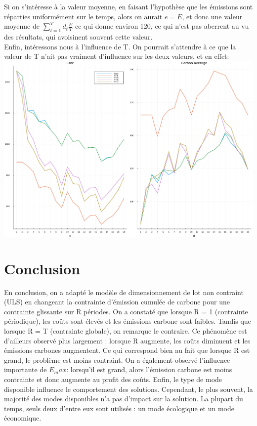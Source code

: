 \documentclass{article}
\begin{document}
	Si on s'intéresse à la valeur moyenne, en faisant l'hypothèse que les émissions sont réparties uniformément sur le temps, alors on aurait $e=E$, et donc une valeur moyenne de $\displaystyle{\sum_{t=1}^T d_t \frac{E}{T}}$ ce qui donne environ 120, ce qui n'est pas aberrent au vu des résultats, qui avoisinent souvent cette valeur.\\
	\newpage
	Enfin, intéressons nous à l'influence de T. On pourrait s'attendre à ce que la valeur de T n'ait pas vraiment d'influence sur les deux valeurs, et en effet:\\
	\includegraphics[width=\textwidth]{graph6.pdf}
	
	\section{Conclusion}
	En conclusion, on a adapté le modèle de dimensionnement de lot non contraint (ULS) en changeant la contrainte d'émission cumulée de carbone pour une contrainte glissante sur R périodes. On a constaté que lorsque R = 1 (contrainte périodique), les coûts sont élevés et les émissions carbone sont faibles. Tandis que lorsque R = T (contrainte globale), on remarque le contraire. Ce phénomène est d'ailleurs observé plus largement : lorsque R augmente, les coûts diminuent et les émissions carbones augmentent. Ce qui correspond bien au fait que lorsque R est grand, le problème est moins contraint. 
	On a également observé l'influence importante de $E_max$: lorsqu'il est grand, alors l'émission carbone est moins contrainte et donc augmente au profit des coûts. 
	Enfin, le type de mode disponible influence le comportement des solutions. Cependant, le plus souvent, la majorité des modes disponibles n'a pas d'impact sur la solution. La plupart du temps, seuls deux d'entre eux sont utilisés : un mode écologique et un mode économique.
	
\end{document}
